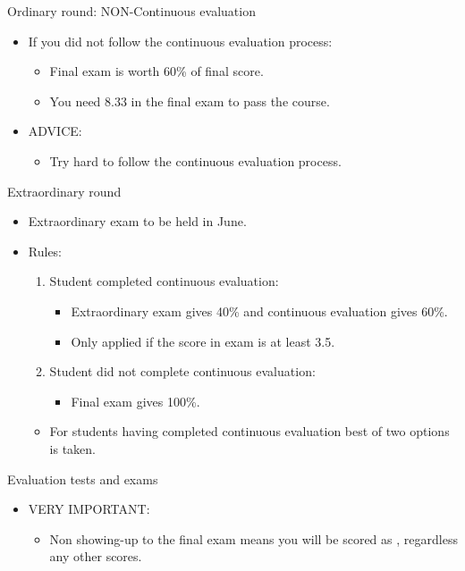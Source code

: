 \begin{frame}[t]{Ordinary round: NON-Continuous evaluation}
\begin{itemize}
  \item If you did not follow the continuous evaluation process:
    \begin{itemize}
      \item Final exam is worth 60\% of final score.
      \item You need 8.33 in the final exam to pass the course.
    \end{itemize}
  \item \alert{ADVICE}:
    \begin{itemize}
      \item Try hard to follow the continuous evaluation process.
    \end{itemize}
\end{itemize}
\end{frame}


\begin{frame}[t]{Extraordinary round}
\begin{itemize}
  \item Extraordinary exam to be held in June.
  \vspace{1em}
  \item Rules:
    \begin{enumerate}
      \item Student completed continuous evaluation:
        \begin{itemize}
          \item Extraordinary exam gives 40\% and continuous evaluation gives 60\%.
          \item Only applied if the score in exam is at least 3.5.
        \end{itemize}
      \item Student did not complete continuous evaluation: 
        \begin{itemize}
          \item Final exam gives 100\%.
        \end{itemize}
    \end{enumerate}
    \begin{itemize}
      \item For students having completed continuous evaluation best of two options is taken.
    \end{itemize}
\end{itemize}
\end{frame}

\begin{frame}[t]{Evaluation tests and exams}
\begin{itemize}
  \item \alert{VERY IMPORTANT}:
    \begin{itemize}
      \item Non showing-up to the final exam means you will be scored as , 
            regardless any other scores.
    \end{itemize}
\end{itemize}
\end{frame}
